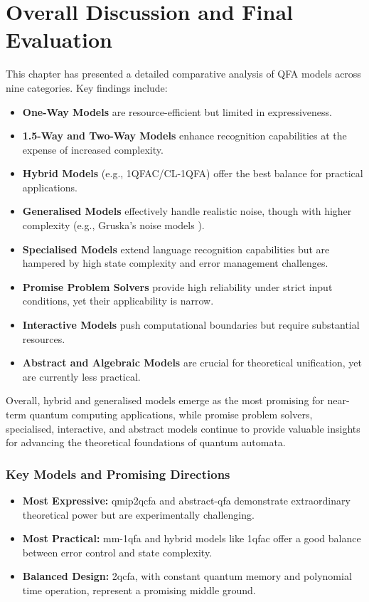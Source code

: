 \section{Overall Discussion and Final Evaluation}
This chapter has presented a detailed comparative analysis of QFA models across nine categories. Key findings include:
\begin{itemize}
    \item \textbf{One-Way Models} are resource-efficient but limited in expressiveness.
    \item \textbf{1.5-Way and Two-Way Models} enhance recognition capabilities at the expense of increased complexity.
    \item \textbf{Hybrid Models} (e.g., 1QFAC/CL-1QFA) offer the best balance for practical applications.
    \item \textbf{Generalised Models} effectively handle realistic noise, though with higher complexity (e.g., Gruska's noise models \cite{gruska2005}).
    \item \textbf{Specialised Models} extend language recognition capabilities but are hampered by high state complexity and error management challenges.
    \item \textbf{Promise Problem Solvers} provide high reliability under strict input conditions, yet their applicability is narrow.
    \item \textbf{Interactive Models} push computational boundaries but require substantial resources.
    \item \textbf{Abstract and Algebraic Models} are crucial for theoretical unification, yet are currently less practical.
\end{itemize}
Overall, hybrid and generalised models emerge as the most promising for near-term quantum computing applications, while promise problem solvers, specialised, interactive, and abstract models continue to provide valuable insights for advancing the theoretical foundations of quantum automata.

\subsubsection{Key Models and Promising Directions}
\begin{itemize}
    \item \textbf{Most Expressive:} \gls{qmip2qcfa} and \gls{abstract-qfa} demonstrate extraordinary theoretical power but are experimentally challenging.
    \item \textbf{Most Practical:} \gls{mm-1qfa} and hybrid models like \gls{1qfac} offer a good balance between error control and state complexity.
    \item \textbf{Balanced Design:} \gls{2qcfa}, with constant quantum memory and polynomial time operation, represent a promising middle ground.
\end{itemize}

